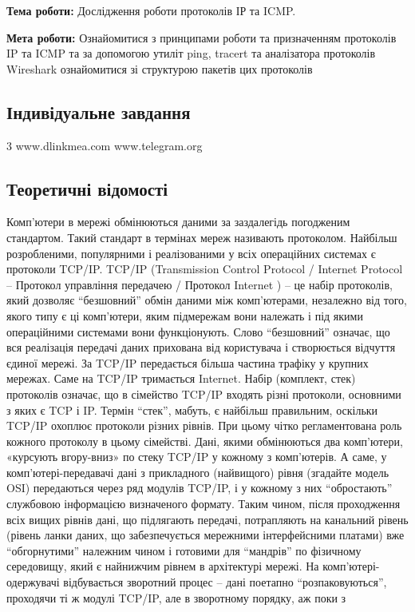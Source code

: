 \documentclass[12pt]{extarticle}
\begin{document}
\textbf{Тема роботи:} Дослідження роботи протоколів ІР та ICMP.
\vspace{12pt}

\textbf{Мета роботи:} Ознайомитися з принципами роботи та призначенням протоколів IP та ICMP
та за допомогою утиліт ping, tracert та аналізатора протоколів Wireshark ознайомитися зі
структурою пакетів цих протоколів
\subsection*{Індивідуальне завдання}
3 www.dlinkmea.com www.telegram.org

\subsection*{Теоретичні відомості}
Комп’ютери в мережі обмінюються даними за заздалегідь погодженим стандартом.
Такий стандарт в термінах мереж називають протоколом. Найбільш розробленими,
популярними і реалізованими у всіх операційних системах є протоколи TCP/IP.
TCP/IP (Transmission Control Protocol / Internet Protocol – Протокол управління
передачею / Протокол Internet ) – це набір протоколів, який дозволяє “безшовний” обмін
даними між комп’ютерами, незалежно від того, якого типу є ці комп’ютери, яким
підмережам вони належать і під якими операційними системами вони функціонують.
Слово “безшовний” означає, що вся реалізація передачі даних прихована від користувача
і створюється відчуття єдиної мережі. За TCP/IP передається більша частина трафіку у
крупних мережах. Саме на TCP/IP тримається Internet. Набір (комплект, стек)
протоколів означає, що в сімейство TCP/IP входять різні протоколи, основними з яких є
TCP і IP. Термін “стек”, мабуть, є найбільш правильним, оскільки TCP/IP охоплює
протоколи різних рівнів. При цьому чітко регламентована роль кожного протоколу в
цьому сімействі. Дані, якими обмінюються два комп’ютери, «курсують вгору-вниз» по
стеку TCP/IP у кожному з комп’ютерів. А саме, у комп’ютері-передавачі дані з
прикладного (найвищого) рівня (згадайте модель OSI) передаються через ряд модулів
TCP/IP, і у кожному з них “обростають” службовою інформацією визначеного формату.
Таким чином, після проходження всіх вищих рівнів дані, що підлягають передачі,
потрапляють на канальний рівень (рівень ланки даних, що забезпечується мережними
інтерфейсними платами) вже “обгорнутими” належним чином і готовими для “мандрів”
по фізичному середовищу, який є найнижчим рівнем в архітектурі мережі. На
комп’ютері-одержувачі відбувається зворотний процес – дані поетапно
“розпаковуються”, проходячи ті ж модулі TCP/IP, але в зворотному порядку, аж поки з
\end{document}
